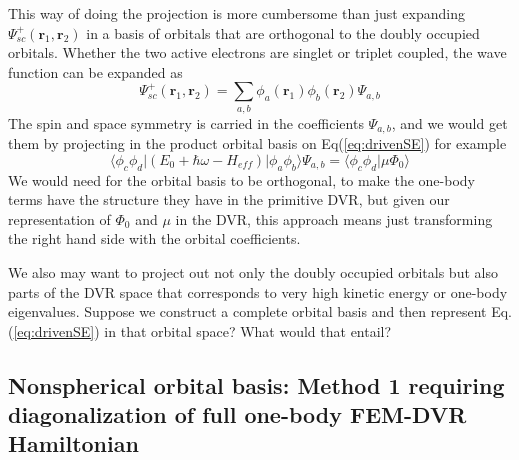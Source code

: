 \documentclass[%
pra%
,twocolumn%
,amssymb, nobibnotes, aps,
longbibliography
]{revtex4-1}
\begin{document}
 This way of doing the projection is more cumbersome than just expanding $\Psi_{sc}^+(\mathbf{r}_1,\mathbf{r}_2) $ in a basis of orbitals that are orthogonal to the doubly occupied orbitals.  Whether the two active electrons are singlet or triplet coupled, the wave function can be expanded as
\begin{equation}
\Psi_{sc}^+(\mathbf{r}_1,\mathbf{r}_2) = \sum_{a,b} \phi_a(\mathbf{r}_1)  \phi_b(\mathbf{r}_2) \Psi_{a,b}
\end{equation}
The spin and space symmetry is carried in the coefficients $ \Psi_{a,b}$, and we would get them by projecting in the product orbital basis on Eq(\ref{eq:drivenSE}) for example
\begin{equation}
\langle \phi_c \phi_d | (E_0+\hbar \omega -H_{eff} )| \phi_a \phi_b \rangle \Psi_{a,b} = \langle \phi_c \phi_d | \mu \Phi_0 \rangle
\label{eq:orbdrivenSE}
\end{equation}
We would need for the orbital basis to be orthogonal, to make the one-body terms have the structure they have in the primitive DVR, but given our representation of $\Phi_0$ and $\mu$ in the DVR, this approach means just transforming the right hand side with the orbital coefficients.

 We also may want to project out not only the doubly occupied orbitals but also parts of the DVR space that corresponds to very high kinetic energy or one-body eigenvalues.   Suppose we construct a complete orbital basis and then represent Eq.(\ref{eq:drivenSE}) in that orbital space?  What would that entail?


\subsection{Nonspherical orbital basis: Method 1 requiring diagonalization of full one-body FEM-DVR Hamiltonian}
\label{sec:nonspherical}
\end{document}
